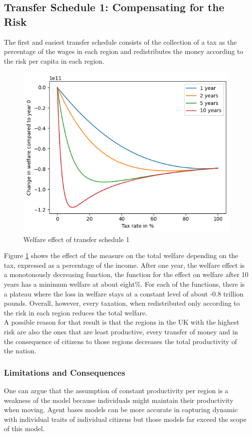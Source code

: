 \documentclass[10pt,a4paper]{article}
\begin{document}
\subsection{Transfer Schedule 1: Compensating for the Risk}
The first and easiest transfer schedule consists of the collection of a tax as the percentage of the wages in each region and redistributes the money according to the risk per capita in each region.
\begin{figure}
    \centering
    \includegraphics{Schedule1.png}
    \caption{Welfare effect of transfer schedule 1}
    \label{fig:sche1}
\end{figure}
Figure \ref{fig:sche1} shows the effect of the measure on the total welfare depending on the tax, expressed as a percentage of the income. After one year, the welfare effect is a monotonously decreasing function, the function for the effect on welfare after 10 years has a minimum welfare at about eight\%. For each of the functions, there is a plateau where the loss in welfare stays at a constant level of about -0.8 trillion pounds. Overall, however, every taxation, when redistributed only according to the risk in each region reduces the total welfare. 
\\
A possible reason for that result is that the regions in the UK with the highest risk are also the ones that are least productive, every transfer of money and in the consequence of citizens to those regions decreases the total productivity of the nation.
\subsubsection{Limitations and Consequences}
One can argue that the assumption of constant productivity per region is a weakness of the model because individuals might maintain their productivity when moving. Agent bases models can be more accurate in capturing dynamic with individual traits of individual citizens but those models far exceed the scope of this model.
\\
\end{document}
